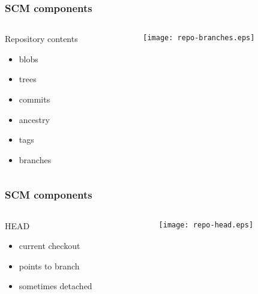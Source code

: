 \documentclass[english]{beamer}
\begin{document}
\begin{frame}
\frametitle{SCM components}
\begin{columns}[t]
        \begin{column}{.5\textwidth}
                Repository contents
                \begin{itemize}
                        \item blobs
                        \item trees
                        \item commits
                        \item ancestry
                        \item tags
                        \item branches
                \end{itemize}
        \end{column}
        \begin{column}[T]{.5\textwidth}
                \vspace{.2\textheight}
                \texttt{[image: repo-branches.eps]}
        \end{column}
\end{columns}

\end{frame}

\begin{frame}
\frametitle{SCM components}
\begin{columns}[t]
        \begin{column}{.5\textwidth}
                HEAD
                \begin{itemize}
                        \item current checkout
                        \item points to branch
                        \item sometimes detached
                \end{itemize}
        \end{column}
        \begin{column}[T]{.5\textwidth}
                \vspace{.2\textheight}
                \texttt{[image: repo-head.eps]}
        \end{column}
\end{columns}

\end{frame}
\end{document}
